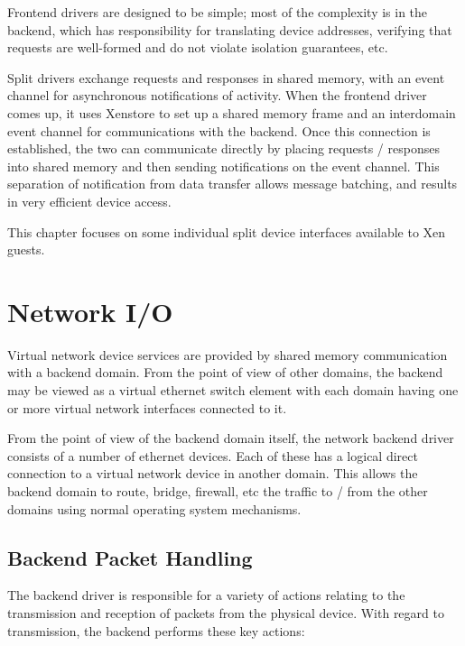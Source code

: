 \documentclass[11pt,twoside,final,openright,a4paper]{report}
\begin{document}
Frontend drivers are designed to be simple; most of the complexity is
in the backend, which has responsibility for translating device
addresses, verifying that requests are well-formed and do not violate
isolation guarantees, etc.

Split drivers exchange requests and responses in shared memory, with
an event channel for asynchronous notifications of activity.  When the
frontend driver comes up, it uses Xenstore to set up a shared memory
frame and an interdomain event channel for communications with the
backend.  Once this connection is established, the two can communicate
directly by placing requests / responses into shared memory and then
sending notifications on the event channel.  This separation of
notification from data transfer allows message batching, and results
in very efficient device access.

This chapter focuses on some individual split device interfaces
available to Xen guests.

        
\section{Network I/O}

Virtual network device services are provided by shared memory
communication with a backend domain.  From the point of view of other
domains, the backend may be viewed as a virtual ethernet switch
element with each domain having one or more virtual network interfaces
connected to it.

From the point of view of the backend domain itself, the network
backend driver consists of a number of ethernet devices.  Each of
these has a logical direct connection to a virtual network device in
another domain.  This allows the backend domain to route, bridge,
firewall, etc the traffic to / from the other domains using normal
operating system mechanisms.

\subsection{Backend Packet Handling}

The backend driver is responsible for a variety of actions relating to
the transmission and reception of packets from the physical device.
With regard to transmission, the backend performs these key actions:
\end{document}
